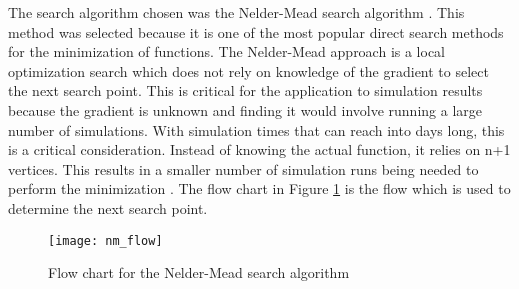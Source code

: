 \label{algrothim_description}

The search algorithm chosen was the Nelder-Mead search algorithm \cite{nelder_1965}.  This method was selected because it is one of the most popular direct search methods for the minimization of functions.  The Nelder-Mead approach is a local optimization search which does not rely on knowledge of the gradient to select the next search point.  This is critical for the application to simulation results because the gradient is unknown and finding it would involve running a large number of simulations.  With simulation times that can reach into days long, this is a critical consideration.  
Instead of knowing the actual function, it relies on n+1 vertices.  This results in a smaller number of simulation runs being needed to perform the minimization \cite{wang_2011}.
The flow chart in Figure \ref{fig:nm_flow} is the flow which is used to determine the next search point.
\begin{figure}[!htb]
	\centering
	\texttt{[image: nm\_flow]}
	\caption{Flow chart for the Nelder-Mead search algorithm}
	\label{fig:nm_flow}
\end{figure}

